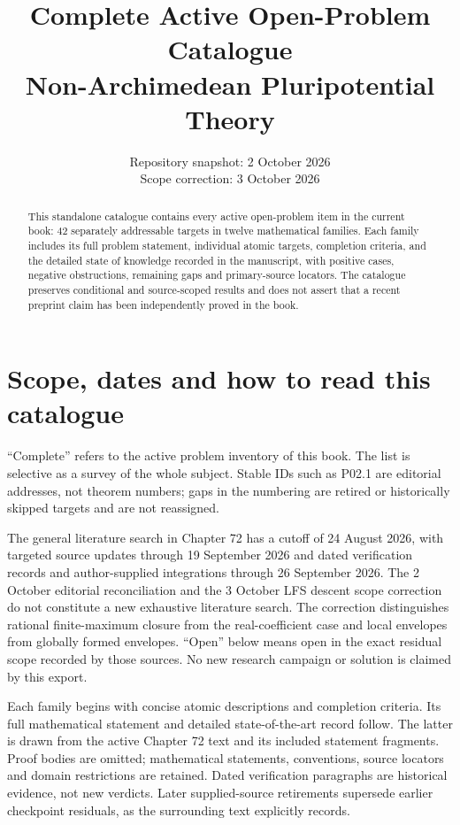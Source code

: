 \documentclass[11pt,a4paper]{article}
\title{Complete Active Open-Problem Catalogue\\[.5em]\large Non-Archimedean Pluripotential Theory}
\author{}
\date{Repository snapshot: 2 October 2026\\Scope correction: 3 October 2026}
\theoremstyle{definition}
\theoremstyle{remark}
\begin{document}
\maketitle
\begin{abstract}
This standalone catalogue contains every active open-problem item in the
current book: 42 separately addressable targets in twelve mathematical
families. Each family includes its full problem statement, individual
atomic targets, completion criteria, and the detailed state of knowledge
recorded in the manuscript, with positive cases, negative obstructions,
remaining gaps and primary-source locators. The catalogue preserves
conditional and source-scoped results and does not assert that a recent
preprint claim has been independently proved in the book.
\end{abstract}
\tableofcontents
\clearpage
\section*{Scope, dates and how to read this catalogue}
``Complete'' refers to the active problem inventory of this book. The list
is selective as a survey of the whole subject. Stable IDs such as P02.1
are editorial addresses, not theorem numbers; gaps in the numbering are
retired or historically skipped targets and are not reassigned.

The general literature search in Chapter 72 has a cutoff of 24 August
2026, with targeted source updates through 19 September 2026 and dated
verification records and author-supplied integrations through 26 September
2026. The 2 October editorial reconciliation and the 3 October LFS descent
scope correction do not constitute a new exhaustive literature search.
The correction distinguishes rational finite-maximum closure from the
real-coefficient case and local envelopes from globally formed envelopes.
``Open'' below means open in the exact
residual scope recorded by those sources. No new research campaign or
solution is claimed by this export.

Each family begins with concise atomic descriptions and completion
criteria. Its full mathematical statement and detailed state-of-the-art
record follow. The latter is drawn from the active Chapter 72 text and its
included statement fragments. Proof bodies are omitted; mathematical
statements, conventions, source locators and domain restrictions are
retained. Dated verification paragraphs are historical evidence, not new
verdicts. Later supplied-source retirements supersede earlier checkpoint
residuals, as the surrounding text explicitly records.
\end{document}
